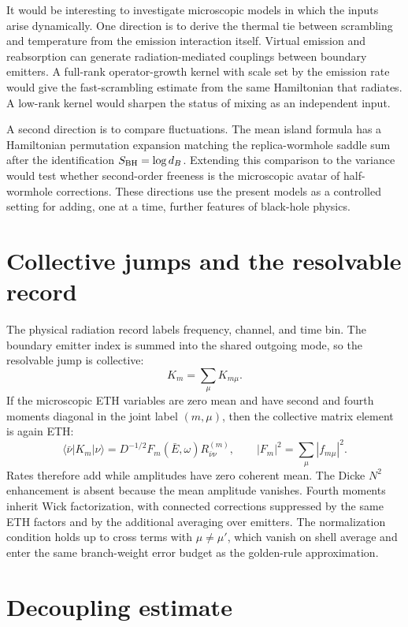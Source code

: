 \documentclass[12pt]{article}
\newcommand{\be}{\begin{equation}}
\newcommand{\ee}{\end{equation}}
\newcommand{\SBH}{S_{\rm BH}}
\newcommand{\ket}[1]{|#1\rangle}
\newcommand{\bra}[1]{\langle #1|}
\begin{document}
It would be interesting to investigate microscopic models in which the inputs
arise dynamically.  One direction is to derive the thermal tie between
scrambling and temperature from the emission interaction itself.  Virtual
emission and reabsorption can generate radiation-mediated couplings between
boundary emitters.  A full-rank operator-growth kernel with scale set by the
emission rate would give the fast-scrambling estimate
\cite{SekinoSusskind2008} from the same Hamiltonian that radiates.  A low-rank
kernel would sharpen the status of mixing as an independent input.

A second direction is to compare fluctuations.  The mean island formula has a
Hamiltonian permutation expansion matching the replica-wormhole saddle sum
after the identification $\SBH=\log d_B$.  Extending this comparison to the
variance would test whether second-order freeness is the microscopic avatar of
half-wormhole corrections.  These directions use the present models as a
controlled setting for adding, one at a time, further features of black-hole
physics.

\appendix

\section{Collective jumps and the resolvable record}

The physical radiation record labels frequency, channel, and time bin.  The
boundary emitter index is summed into the shared outgoing mode, so the
resolvable jump is collective:
\be
  K_m=\sum_\mu K_{m\mu}.
\ee
If the microscopic ETH variables are zero mean and have second and fourth
moments diagonal in the joint label $(m,\mu)$, then the collective matrix
element is again ETH:
\be
  \bra{\bar\nu}K_m\ket{\nu}
  =
  D^{-1/2} F_m(\bar E,\omega) R^{(m)}_{\bar\nu\nu},
  \qquad
  |F_m|^2=\sum_\mu |f_{m\mu}|^2 .
\ee
Rates therefore add while amplitudes have zero coherent mean.  The Dicke
$N^2$ enhancement is absent because the mean amplitude vanishes.  Fourth
moments inherit Wick factorization, with connected corrections suppressed by
the same ETH factors and by the additional averaging over emitters.  The
normalization condition holds up to cross terms with $\mu\ne\mu'$, which vanish
on shell average and enter the same branch-weight error budget as the
golden-rule approximation.

\section{Decoupling estimate}
\end{document}

